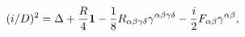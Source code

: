 \begin{equation}
(i\slash D )^2=\Delta +{R\over 4}{\bf 1} -
{1\over 8}R_{\alpha\beta\gamma\delta}\gamma^{\alpha\beta\gamma\delta}
-{i\over 2} F_{\alpha\beta}\gamma^{\alpha\beta},
\label{TorsionHamiltonian}
\end{equation}

